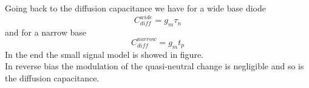 Going back to the diffusion capacitance we have for a wide base diode
\begin{equation}
C_{diff}^{wide}=g_m\tau_n
\end{equation} 
and for a narrow base
\begin{equation}
C_{diff}^{narrow}=g_mt_p
\end{equation}
In the end the small signal model is showed in figure.\\
In reverse bias the modulation of the quasi-neutral change is negligible and so is the diffusion capacitance.

